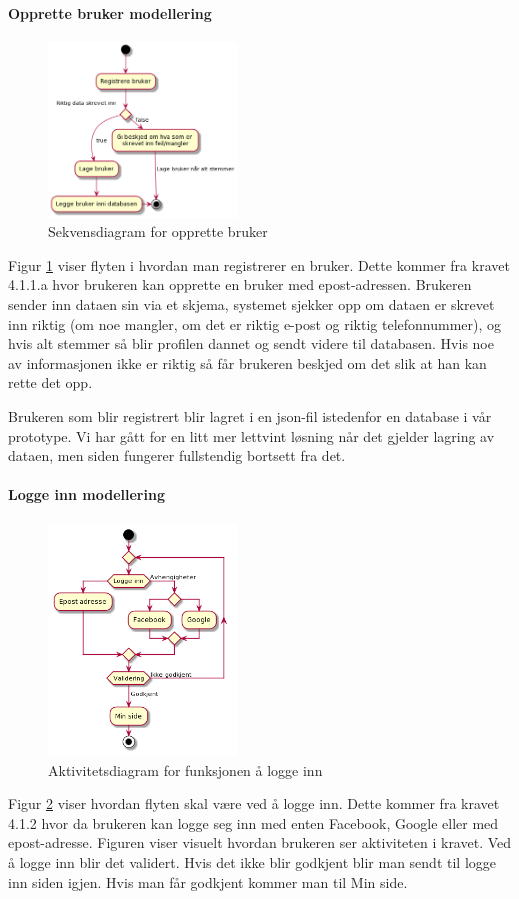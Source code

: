 \paragraph{Opprette bruker modellering}
\begin{figure}[H]
    \centering
    \includegraphics[width=5cm]{bilder/uml/registerebruke.png}
    \caption{Sekvensdiagram for opprette bruker}
    \label{fig:reg_bruker}
\end{figure}
Figur \ref{fig:reg_bruker} viser flyten i hvordan man registrerer en bruker. Dette kommer fra kravet 4.1.1.a hvor brukeren kan opprette en bruker med epost-adressen. Brukeren sender inn dataen sin via et skjema, systemet sjekker opp om dataen er skrevet inn riktig (om noe mangler, om det er riktig e-post og riktig telefonnummer), og hvis alt stemmer så blir profilen dannet og sendt videre til databasen. Hvis noe av informasjonen ikke er riktig så får brukeren beskjed om det slik at han kan rette det opp. 

Brukeren som blir registrert blir lagret i en json-fil istedenfor en database i vår prototype. Vi har gått for en litt mer lettvint løsning når det gjelder lagring av dataen, men siden fungerer fullstendig bortsett fra det.  

 
\paragraph{Logge inn modellering}

\begin{figure}[H]
\centering
\includegraphics[width=5cm]{bilder/uml/loggeinn.png}
\caption{Aktivitetsdiagram for funksjonen å logge inn}
\label{fig:logginn}
\end{figure}
Figur \ref{fig:logginn} viser hvordan flyten skal være ved å logge inn. Dette kommer fra kravet 4.1.2 hvor da brukeren kan logge seg inn med enten Facebook, Google eller med epost-adresse. Figuren viser visuelt hvordan brukeren ser aktiviteten i kravet. Ved å logge inn blir det validert. Hvis det ikke blir godkjent blir man sendt til logge inn siden igjen. Hvis man får godkjent kommer man til Min side.

